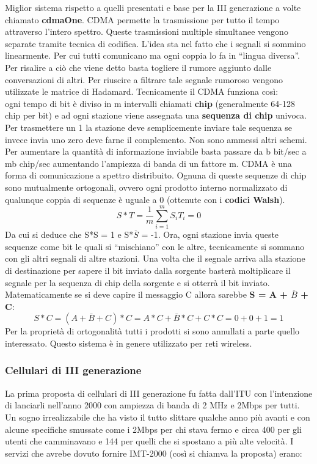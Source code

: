 Miglior sistema rispetto a quelli presentati e base per la III generazione a volte chiamato \textbf{cdmaOne}. CDMA permette la trasmissione per tutto il tempo attraverso l'intero spettro. Queste trasmissioni multiple simultanee vengono separate tramite tecnica di codifica. L'idea sta nel fatto che i segnali si sommino linearmente. Per cui tutti comunicano ma ogni coppia lo fa in ``lingua diversa''. Per risalire a ciò che viene detto basta togliere il rumore aggiunto dalle conversazioni di altri. Per riuscire a filtrare tale segnale rumoroso vengono utilizzate le matrice di Hadamard. Tecnicamente il CDMA funziona così:\\ ogni tempo di bit è diviso in m intervalli chiamati \textbf{chip} (generalmente 64-128 chip per bit) e ad ogni stazione viene assegnata una \textbf{sequenza di chip} univoca. Per trasmettere un 1 la stazione deve semplicemente inviare tale sequenza se invece invia uno zero deve farne il complemento. Non sono ammessi altri schemi. Per aumentare la quantità di informazione inviabile basta passare da b bit/sec a mb chip/sec aumentando l'ampiezza di banda di un fattore m. CDMA è una forma di comunicazione a spettro distribuito. Ognuna di queste sequenze di chip sono mutualmente ortogonali, ovvero ogni prodotto interno normalizzato di qualunque coppia di sequenze è uguale a 0 (ottenute con i \textbf{codici Walsh}). 
\[ S*T = \frac{1}{m}\sum\limits_{i=1}^m S_i T_i = 0\]
Da cui si deduce che S*S = 1 e S*\(\overline{S}\) = -1. 
Ora, ogni stazione invia queste sequenze come bit le quali si ``mischiano'' con le altre, tecnicamente si sommano con gli altri segnali di altre stazioni. Una volta che il segnale arriva alla stazione di destinazione per sapere il bit inviato dalla sorgente basterà moltiplicare il segnale per la sequenza di chip della sorgente e si otterrà il bit inviato.
Matematicamente se si deve capire il messaggio C allora sarebbe \textbf{S = A + \(\overline{B}\) + C}:
\[S*C = (A+ \bar{B} + C)*C = A*C + \bar{B}*C + C*C = 0 + 0 + 1 = 1\]
Per la proprietà di ortogonalità tutti i prodotti si sono annullati a parte quello interessato. Questo sistema è in genere utilizzato per reti wireless.

\subsubsection{Cellulari di III generazione}

La prima proposta di cellulari di III generazione fu fatta dall'ITU con l'intenzione di lanciarli nell'anno 2000 con ampiezza di banda di 2 MHz e 2Mbps per tutti. Un sogno irrealizzabile che ha visto il tutto slittare qualche anno più avanti e con alcune specifiche smussate come i 2Mbps per chi stava fermo e circa 400 per gli utenti che camminavano e 144 per quelli che si spostano a più alte velocità. I servizi che avrebe dovuto fornire IMT-2000 (così si chiamva la proposta) erano:

